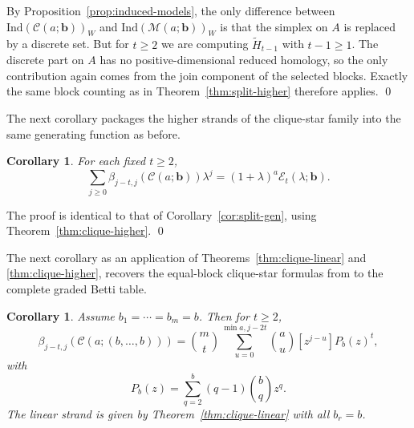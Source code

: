 \documentclass[12pt]{article}
\renewenvironment{proof}{{\bf \noindent Proof.}}{\qed}
\newtheorem{corollary}[theorem]{Corollary}
\theoremstyle{definition}
\theoremstyle{remark}
\newcommand{\EE}{\mathcal{E}}
\newcommand{\MM}{\mathcal{M}}
\newcommand{\CC}{\mathcal{C}}
\newcommand{\ind}{\mathrm{Ind}}
\newcommand{\bk}[1]{\mathbf{#1}}
\newcommand{\wt}{\widetilde}
\begin{document}
	\begin{proof}
		By Proposition~\ref{prop:induced-models}, the only difference between $\ind(\CC(a;\bk{b}))_W$ and $\ind(\MM(a;\bk{b}))_W$ is that the simplex on $A$ is replaced by a discrete set. But for $t\geq 2$ we are computing $\wt H_{t-1}$ with $t-1\geq 1$. The discrete part on $A$ has no positive-dimensional reduced homology, so the only contribution again comes from the join component of the selected blocks. Exactly the same block counting as in Theorem~\ref{thm:split-higher} therefore applies.
	\end{proof}
	
	 \medskip The next corollary packages the higher strands of the clique-star family into the same generating function as before.
	
	\begin{corollary}\label{cor:clique-gen}
		For each fixed $t\geq 2$,
		$$
		\sum_{j\geq 0}\beta_{j-t,j}(\CC(a;\bk{b}))\lambda^j
		=(1+\lambda)^a\EE_t(\lambda;\bk{b}).
		$$
	\end{corollary}
	
	\begin{proof}
		The proof is identical to that of Corollary~\ref{cor:split-gen}, using Theorem~\ref{thm:clique-higher}.
	\end{proof}
	
	 \medskip The next corollary as an application of Theorems~\ref{thm:clique-linear} and \ref{thm:clique-higher}, recovers the  equal-block clique-star formulas from \cite{Rather2024} to the complete graded Betti table.
	
	\begin{corollary}\label{cor:clique-equal}
		Assume $b_1=\cdots=b_m=b$. Then for $t\geq 2$,
		$$
		\beta_{j-t,j}(\CC(a;(b,\dots,b)))
		= \binom{m}{t}
		\sum_{u=0}^{\min{a,j-2t}}
		\binom{a}{u}[z^{j-u}]P_b(z)^t,
		$$
		with
		$$
		P_b(z)=\sum_{q=2}^{b}(q-1)\binom{b}{q}z^q.
		$$
		The linear strand is given by Theorem~\ref{thm:clique-linear} with all $b_r=b$.
	\end{corollary}
\end{document}
